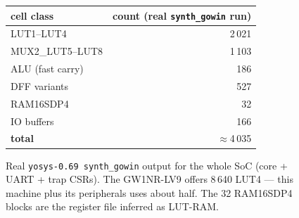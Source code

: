 \begin{figure}[htbp]
\centering
\begin{tabular}{lr}
\toprule
cell class & count (real \texttt{synth\_gowin} run) \\
\midrule
LUT1--LUT4           & 2\,021 \\
MUX2\_LUT5--LUT8     & 1\,103 \\
ALU (fast carry)     & 186 \\
DFF variants         & 527 \\
RAM16SDP4            & 32 \\
IO buffers           & 166 \\
\midrule
\textbf{total}       & $\approx$4\,035 \\
\bottomrule
\end{tabular}
\caption{Real \texttt{yosys-0.69 synth\_gowin} output for the whole
SoC (core + UART + trap CSRs). The GW1NR-LV9 offers 8\,640 LUT4 ---
this machine plus its peripherals uses about half. The 32
RAM16SDP4 blocks are the register file inferred as LUT-RAM.}
\label{fig:synth08}
\end{figure}
